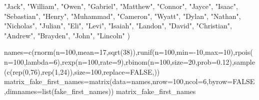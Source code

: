 \documentclass[
]{article}
\newenvironment{Shaded}{\begin{snugshade}}{\end{snugshade}}
\newcommand{\AttributeTok}[1]{\textcolor[rgb]{0.77,0.63,0.00}{#1}}
\newcommand{\ConstantTok}[1]{\textcolor[rgb]{0.00,0.00,0.00}{#1}}
\newcommand{\DecValTok}[1]{\textcolor[rgb]{0.00,0.00,0.81}{#1}}
\newcommand{\FloatTok}[1]{\textcolor[rgb]{0.00,0.00,0.81}{#1}}
\newcommand{\FunctionTok}[1]{\textcolor[rgb]{0.00,0.00,0.00}{#1}}
\newcommand{\NormalTok}[1]{#1}
\newcommand{\OtherTok}[1]{\textcolor[rgb]{0.56,0.35,0.01}{#1}}
\newcommand{\SpecialCharTok}[1]{\textcolor[rgb]{0.00,0.00,0.00}{#1}}
\newcommand{\StringTok}[1]{\textcolor[rgb]{0.31,0.60,0.02}{#1}}
\begin{document}
\begin{Shaded}
\begin{Highlighting}[]
  \StringTok{"Jack"}\NormalTok{, }\StringTok{"William"}\NormalTok{, }\StringTok{"Owen"}\NormalTok{, }\StringTok{"Gabriel"}\NormalTok{, }\StringTok{"Matthew"}\NormalTok{, }\StringTok{"Connor"}\NormalTok{, }\StringTok{"Jayce"}\NormalTok{, }
  \StringTok{"Isaac"}\NormalTok{, }\StringTok{"Sebastian"}\NormalTok{, }\StringTok{"Henry"}\NormalTok{, }\StringTok{"Muhammad"}\NormalTok{, }\StringTok{"Cameron"}\NormalTok{, }\StringTok{"Wyatt"}\NormalTok{, }
  \StringTok{"Dylan"}\NormalTok{, }\StringTok{"Nathan"}\NormalTok{, }\StringTok{"Nicholas"}\NormalTok{, }\StringTok{"Julian"}\NormalTok{, }\StringTok{"Eli"}\NormalTok{, }\StringTok{"Levi"}\NormalTok{, }\StringTok{"Isaiah"}\NormalTok{, }
  \StringTok{"Landon"}\NormalTok{, }\StringTok{"David"}\NormalTok{, }\StringTok{"Christian"}\NormalTok{, }\StringTok{"Andrew"}\NormalTok{, }\StringTok{"Brayden"}\NormalTok{, }\StringTok{"John"}\NormalTok{, }
  \StringTok{"Lincoln"}
\NormalTok{)}

\NormalTok{names}\OtherTok{=}\FunctionTok{c}\NormalTok{(}\FunctionTok{rnorm}\NormalTok{(}\AttributeTok{n=}\DecValTok{100}\NormalTok{,}\AttributeTok{mean=}\DecValTok{17}\NormalTok{,}\FunctionTok{sqrt}\NormalTok{(}\DecValTok{38}\NormalTok{)),}\FunctionTok{runif}\NormalTok{(}\AttributeTok{n=}\DecValTok{100}\NormalTok{,}\AttributeTok{min=}\SpecialCharTok{{-}}\DecValTok{10}\NormalTok{,}\AttributeTok{max=}\DecValTok{10}\NormalTok{),}\FunctionTok{rpois}\NormalTok{(}\AttributeTok{n=}\DecValTok{100}\NormalTok{,}\AttributeTok{lambda=}\DecValTok{6}\NormalTok{),}\FunctionTok{rexp}\NormalTok{(}\AttributeTok{n=}\DecValTok{100}\NormalTok{,}\AttributeTok{rate=}\DecValTok{9}\NormalTok{),}\FunctionTok{rbinom}\NormalTok{(}\AttributeTok{n=}\DecValTok{100}\NormalTok{,}\AttributeTok{size=}\DecValTok{20}\NormalTok{,}\AttributeTok{prob=}\FloatTok{0.12}\NormalTok{),}\FunctionTok{sample}\NormalTok{(}\FunctionTok{c}\NormalTok{(}\FunctionTok{rep}\NormalTok{(}\DecValTok{0}\NormalTok{,}\DecValTok{76}\NormalTok{),}\FunctionTok{rep}\NormalTok{(}\DecValTok{1}\NormalTok{,}\DecValTok{24}\NormalTok{)),}\AttributeTok{size=}\DecValTok{100}\NormalTok{,}\AttributeTok{replace=}\ConstantTok{FALSE}\NormalTok{,))}
\NormalTok{matrix\_fake\_first\_names}\OtherTok{=}\FunctionTok{matrix}\NormalTok{(}\AttributeTok{data=}\NormalTok{names,}\AttributeTok{nrow=}\DecValTok{100}\NormalTok{,}\AttributeTok{ncol=}\DecValTok{6}\NormalTok{,}\AttributeTok{byrow=}\ConstantTok{FALSE}\NormalTok{,}\AttributeTok{dimnames=}\FunctionTok{list}\NormalTok{(fake\_first\_names))}
\NormalTok{matrix\_fake\_first\_names}
\end{Highlighting}
\end{Shaded}
\end{document}
